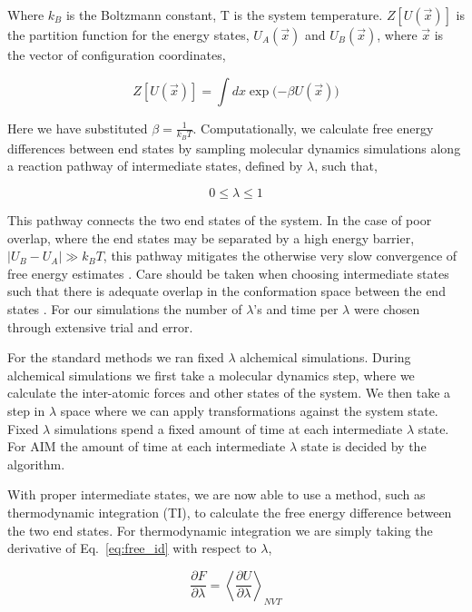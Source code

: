 Where $k_{B}$ is the Boltzmann constant, T is the system temperature. $Z[U(\vec{x})]$ is the partition function for the energy states, $U_{A}(\vec{x})$ and $U_{B}(\vec{x})$, where $\vec{x}$ is the vector of configuration coordinates,

\begin{equation}\label{eq:part}
    Z[U(\vec{x})] = \int dx \exp{(-\beta U(\vec{x})})
\end{equation}

Here we have substituted $\beta = \frac{1}{k_{B}T}$. Computationally, we calculate free energy differences between end states by sampling molecular dynamics simulations along a reaction pathway of intermediate states, defined by $\lambda$, such that,

\begin{equation}
    0 \leq \lambda \leq 1
\end{equation}

This pathway connects the two end states of the system. In the case of poor overlap, where the end states may be separated by a high energy barrier, $|U_{B} - U_{A}| \gg k_{B}T$, this pathway mitigates the otherwise very slow convergence of free energy estimates \cite{Shirts2007}. Care should be taken when choosing intermediate states such that there is adequate overlap in the conformation space between the end states \cite{Shirts2007, Klimovich2015}. For our simulations the number of $\lambda$'s and time per $\lambda$ were chosen through extensive trial and error. 

For the standard methods we ran fixed $\lambda$ alchemical simulations. During alchemical simulations we first take a molecular dynamics step, where we calculate the inter-atomic forces and other states of the system. We then take a step in $\lambda$ space where we can apply transformations against the system state. Fixed $\lambda$ simulations spend a fixed amount of time at each intermediate $\lambda$ state. For AIM the amount of time at each intermediate $\lambda$ state is decided by the algorithm.

With proper intermediate states, we are now able to use a method, such as thermodynamic integration (TI), to calculate the free energy difference between the two end states. For thermodynamic integration we are simply taking the derivative of Eq.\ \ref{eq:free_id} with respect to $\lambda$,

\begin{equation}\label{eq:diffeq}
    \frac{\partial F}{\partial \lambda} = \left< \frac{\partial U}{\partial \lambda} \right>_{NVT}
\end{equation}


